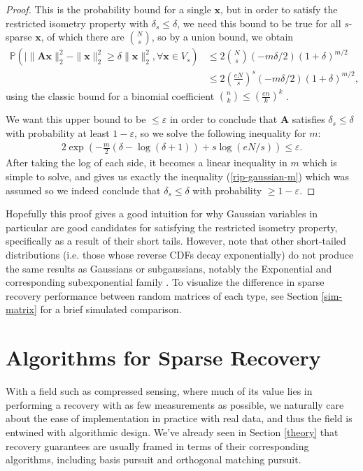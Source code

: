 \documentclass[12pt,a4paper]{amsart}
\numberwithin{equation}{section}
\theoremstyle{plain}
\theoremstyle{definition}
\newcommand{\BP}{\mathbb P}
\newcommand{\bdx}{\mathbf{x}}
\newcommand{\bdA}{\mathbf{A}}
\begin{document}
\begin{proof}
    This is the probability bound for a single $\bdx$, but in order to satisfy the restricted isometry property with $\delta_s\leq\delta$, we need this bound to be true for all $s$-sparse $\bdx$, of which there are $\binom{N}{s}$, so by a union bound, we obtain
    \begin{align*}
        \BP(|\|\bdA\bdx\|_2^2-\|\bdx\|_2^2\geq\delta\|\bdx\|_2^2,\forall\bdx\in V_s)&\leq2\binom{N}{s}\left(-m\delta/2\right)(1+\delta)^{m/2}\\&\leq2\left(\frac{eN}{s}\right)^s\left(-m\delta/2\right)(1+\delta)^{m/2},
    \end{align*}
    using the classic bound for a binomial coefficient $\binom{n}{k}\leq\left(\frac{en}{k}\right)^k$ \cite{park-lee}.
    
    We want this upper bound to be $\leq\varepsilon$ in order to conclude that $\bdA$ satisfies $\delta_s\leq\delta$ with probability at least $1-\varepsilon$, so we solve the following inequality for $m$:
    \begin{align*}
        2\exp(-\frac{m}{2}(\delta-\log(\delta+1))+s\log(eN/s))\leq\varepsilon.
    \end{align*}
    After taking the log of each side, it becomes a linear inequality in $m$ which is simple to solve, and gives us exactly the inequality (\ref{rip-gaussian-m}) which was assumed so we indeed conclude that $\delta_s\leq\delta$ with probability $\geq1-\varepsilon$.
    
\end{proof}

Hopefully this proof gives a good intuition for why Gaussian variables in particular are good candidates for satisfying the restricted isometry property, specifically as a result of their short tails. However, note that other short-tailed distributions (i.e. those whose reverse CDFs decay exponentially) do not produce the same results as Gaussians or subgaussians, notably the Exponential and corresponding subexponential family \cite{fou-rau}. To visualize the difference in sparse recovery performance between random matrices of each type, see Section \ref{sim-matrix} for a brief simulated comparison.

\section{Algorithms for Sparse Recovery}\label{algs}

With a field such as compressed sensing, where much of its value lies in performing a recovery with as few measurements as possible, we naturally care about the ease of implementation in practice with real data, and thus the field is entwined with algorithmic design. We've already seen in Section \ref{theory} that recovery guarantees are usually framed in terms of their corresponding algorithms, including basis pursuit and orthogonal matching pursuit. 
\end{document}
